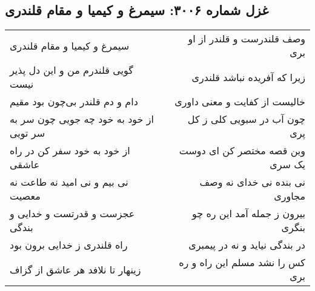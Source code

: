 \begin{center}
\section*{غزل شماره ۳۰۰۶: سیمرغ و کیمیا و مقام قلندری}
\label{sec:3006}
\begin{longtable}{l p{0.5cm} r}
سیمرغ و کیمیا و مقام قلندری
&&
وصف قلندرست و قلندر از او بری
\\
گویی قلندرم من و این دل پذیر نیست
&&
زیرا که آفریده نباشد قلندری
\\
دام و دم قلندر بی‌چون بود مقیم
&&
خالیست از کفایت و معنی داوری
\\
از خود به خود چه جویی چون سر به سر تویی
&&
چون آب در سبویی کلی ز کل پری
\\
از خود به خود سفر کن در راه عاشقی
&&
وین قصه مختصر کن ای دوست یک سری
\\
نی بیم و نی امید نه طاعت نه معصیت
&&
نی بنده نی خدای نه وصف مجاوری
\\
عجزست و قدرتست و خدایی و بندگی
&&
بیرون ز جمله آمد این ره چو بنگری
\\
راه قلندری ز خدایی برون بود
&&
در بندگی نیاید و نه در پیمبری
\\
زینهار تا نلافد هر عاشق از گزاف
&&
کس را نشد مسلم این راه و ره بری
\\
\end{longtable}
\end{center}
